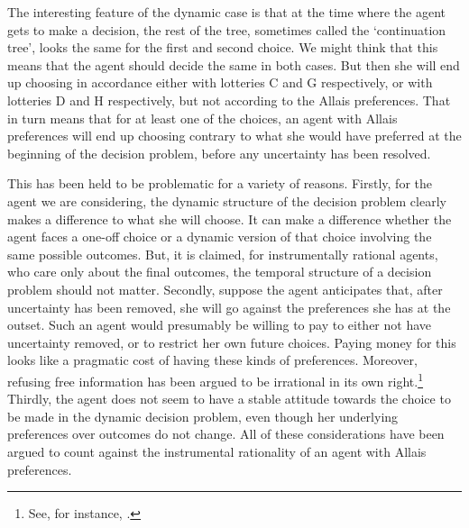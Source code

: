The interesting feature of the dynamic case is that at the time where the agent gets to make a decision, the rest of the tree, sometimes called the `continuation tree', looks the same for the first and second choice. We might think that this means that the agent should decide the same in both cases. But then she will end up choosing in accordance either with lotteries C and G respectively, or with lotteries D and H respectively, but not according to the Allais preferences. That in turn means that for at least one of the choices, an agent with Allais preferences will end up choosing contrary to what she would have preferred at the beginning of the decision problem, before any uncertainty has been resolved.

This has been held to be problematic for a variety of reasons. Firstly, for the agent we are considering, the dynamic structure of the decision problem clearly makes a difference to what she will choose. It can make a difference whether the agent faces a one-off choice or a dynamic version of that choice involving the same possible outcomes. But, it is claimed, for instrumentally rational agents, who care only about the final outcomes, the temporal structure of a decision problem should not matter. Secondly, suppose the agent anticipates that, after uncertainty has been removed, she will go against the preferences she has at the outset. Such an agent would presumably be willing to pay to either not have uncertainty removed, or to restrict her own future choices. Paying money for this looks like a pragmatic cost of having these kinds of preferences. Moreover, refusing free information has been argued to be irrational in its own right.\footnote{See, for instance, \citet{Wakker1988}.} Thirdly, the agent does not seem to have a stable attitude towards the choice to be made in the dynamic decision problem, even though her underlying preferences over outcomes do not change. All of these considerations have been argued to count against the instrumental rationality of an agent with Allais preferences.

